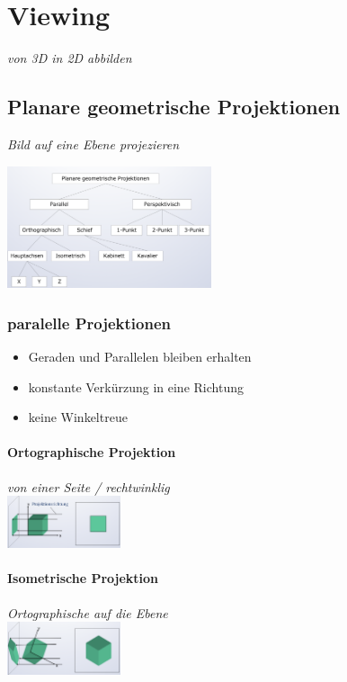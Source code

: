 \section{Viewing}
\textit{von 3D in 2D abbilden}

\subsection{Planare geometrische Projektionen}
\textit{Bild auf eine Ebene projezieren}

\includegraphics[width=0.45\textwidth]{assets/KlassifikationvonProjektionen.png}

\subsubsection{paralelle Projektionen}

\begin{itemize}
    \item Geraden und Parallelen bleiben erhalten
    \item konstante Verkürzung in eine Richtung
    \item keine Winkeltreue
\end{itemize}

\paragraph{Ortographische Projektion}
\textit{von einer Seite / rechtwinklig}\\
\includegraphics[width=0.25\textwidth]{assets/OrtographischeProjektion.png}

\paragraph{Isometrische Projektion}
\textit{Ortographische auf die Ebene}\\
\includegraphics[width=0.25\textwidth]{assets/IsometrischeProjektion.png}

